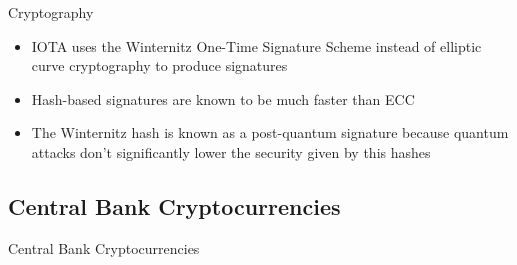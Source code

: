 \documentclass[10pt]{beamer}
\begin{document}

\begin{frame}{Cryptography}
	\begin{itemize}
		\item IOTA uses the Winternitz One-Time Signature Scheme instead of elliptic curve cryptography to produce signatures
		\item Hash-based signatures are known to be much faster than ECC
		\item The Winternitz hash is known as a post-quantum signature because quantum attacks don't significantly lower the security given by this hashes
	\end{itemize}
\end{frame}



\subsection{Central Bank Cryptocurrencies}

\begin{frame}
	\begin{center}
		\begin{large}
			Central Bank Cryptocurrencies
		\end{large}
	\end{center}
\end{frame}

\end{document}
